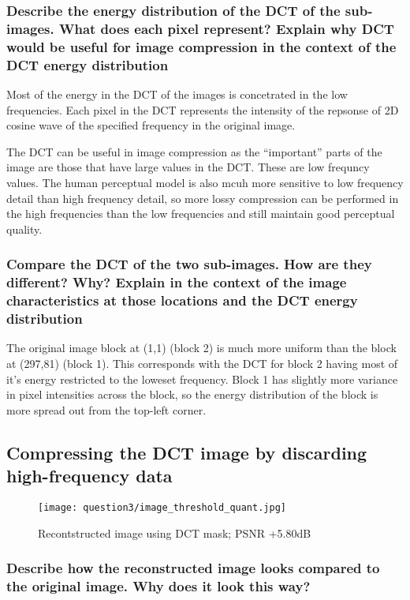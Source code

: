 \subsubsection{Describe the energy distribution of the DCT of the sub-images. What does each pixel represent? Explain why DCT would be useful for image compression in the context of the DCT energy distribution}

Most of the energy in the DCT of the images is concetrated in the low frequencies. Each pixel in the DCT represents the intensity of the repsonse of 2D cosine wave of the specified frequency in the original image.

The DCT can be useful in image compression as the ``important'' parts of the image are those that have large values in the DCT. These are low frequncy values. The human perceptual model is also mcuh more sensitive to low frequency detail than high frequency detail, so more lossy compression can be performed in the high frequencies than the low frequencies and still maintain good perceptual quality.

\subsubsection{Compare the DCT of the two sub-images. How are they different? Why? Explain in the context of the image characteristics at those locations and the DCT energy distribution}

The original image block at (1,1) (block 2) is much more uniform than the block at (297,81) (block 1). This corresponds with the DCT for block 2 having most of it's energy restricted to the loweset frequency. Block 1 has slightly more variance in pixel intensities across the block, so the energy distribution of the block is more spread out from the top-left corner.

\clearpage
\subsection{Compressing the DCT image by discarding high-frequency data}

\begin{figure}[ht]
	\centering
	\texttt{[image: question3/image\_threshold\_quant.jpg]}
	\caption{Recontstructed image using DCT mask; PSNR +5.80dB}
\end{figure}

\subsubsection{Describe how the reconstructed image looks compared to the original image. Why does it look this way?}

